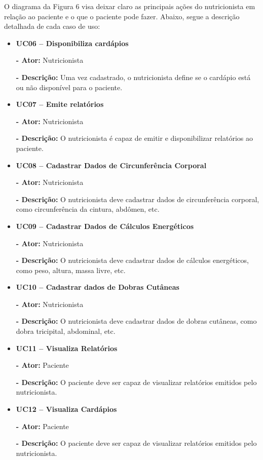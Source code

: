 \documentclass[
	12pt,				%
    oneside,			%
	a4paper,			%
	english,			%
	french,				%
	spanish,			%
	brazil,				%
	]{abntex2}
\begin{document}
O diagrama da Figura 6 visa deixar claro as principais ações do nutricionista
em relação ao paciente e o que o paciente pode fazer. Abaixo, segue a descrição
detalhada de cada caso de uso:

\begin{itemize}
\item \textbf{UC06 – Disponibiliza cardápios}

\textbf{- Ator:} Nutricionista

\textbf{- Descrição:} Uma vez cadastrado, o nutricionista define se o
cardápio está ou não disponível para o paciente.

\item \textbf{UC07 – Emite relatórios}

\textbf{- Ator:} Nutricionista

\textbf{- Descrição:} O nutricionista é capaz de emitir e disponibilizar
relatórios ao paciente.

\item \textbf{UC08 – Cadastrar Dados de Circunferência Corporal}

\textbf{- Ator:} Nutricionista

\textbf{- Descrição:} O nutricionista deve cadastrar dados de
circunferência corporal, como circunferência da cintura, abdômen,
etc.

\item \textbf{UC09 – Cadastrar Dados de Cálculos Energéticos}

\textbf{- Ator:} Nutricionista

\textbf{- Descrição:} O nutricionista deve cadastrar dados de cálculos
energéticos, como peso, altura, massa livre, etc.

\item \textbf{UC10 – Cadastrar dados de Dobras Cutâneas}

\textbf{- Ator:} Nutricionista

\textbf{- Descrição:} O nutricionista deve cadastrar dados de dobras
cutâneas, como dobra tricipital, abdominal, etc.

\item \textbf{UC11 – Visualiza Relatórios}

\textbf{- Ator:} Paciente

\textbf{- Descrição:} O paciente deve ser capaz de visualizar relatórios
emitidos pelo nutricionista.

\item \textbf{UC12 – Visualiza Cardápios}

\textbf{- Ator:} Paciente

\textbf{- Descrição:} O paciente deve ser capaz de visualizar relatórios
emitidos pelo nutricionista.

\end{itemize}
\end{document}
